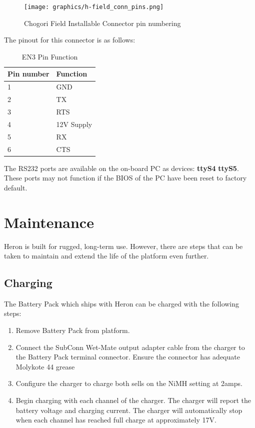 \documentclass[]{clearpath-latex/clearpath-manual}
\begin{document}
\begin{figure}[h]
  \centering
  \texttt{[image: graphics/h-field\_conn\_pins.png]}
  \label{chg_pins}
  \caption{Chogori Field Installable Connector pin numbering }
\end{figure}


The pinout for this connector is as follows:


\begin{table}[h]
\centering
\label{chg_pinout}
\begin{tabular}{|l|l|}
Pin number  & Function \\
\hline
1  & GND              \\ \hline
2  & TX  \\ \hline
3  & RTS  \\ \hline
4  & 12V Supply            \\ \hline
5  & RX             \\ \hline
6  & CTS            \\ \hline

\end{tabular}
\caption{EN3 Pin Function}
\end{table}

The RS232 ports are available on the on-board PC as devices: \textbf{ttyS4} \textbf{ttyS5}. These ports may not function if the BIOS of the PC have been reset to factory default.

\newpage

\section{Maintenance}
Heron is built for rugged, long-term use. However, there are steps that can be taken to maintain and extend the life of the platform even further.

\subsection{Charging}
The Battery Pack which ships with Heron can be charged with the following steps:

\begin{enumerate}[nolistsep]
	\item Remove Battery Pack from platform.
	\item Connect the SubConn Wet-Mate output adapter cable from the charger to the Battery Pack terminal connector. Ensure the connector has adequate Molykote 44 grease
	\item Configure the charger to charge both sells on the NiMH setting at 2amps.
	\item Begin charging with each channel of the charger. The charger will report the battery voltage and charging current. The charger will automatically stop when each channel has reached full charge at approximately 17V.
\end{enumerate}
\end{document}

